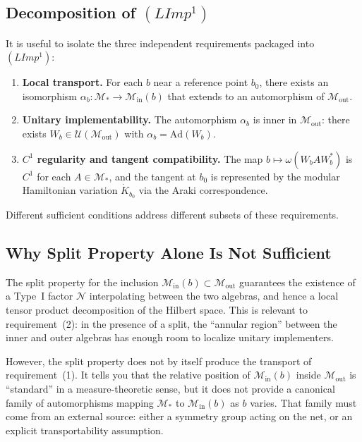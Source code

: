 \documentclass[12pt]{article}
\theoremstyle{definition}
\theoremstyle{remark}
\begin{document}
\subsection{Decomposition of \texorpdfstring{$(LImp^1)$}{(LImp1)}}\label{decomposition-limp}

It is useful to isolate the three independent requirements packaged into $(LImp^1)$:

\begin{enumerate}
\item \textbf{Local transport.} For each $b$ near a reference point $b_0$, there exists an isomorphism $\alpha_b\colon \mathcal{M}_* \to \mathcal{M}_{\mathrm{in}}(b)$ that extends to an automorphism of $\mathcal{M}_{\mathrm{out}}$.
\item \textbf{Unitary implementability.} The automorphism $\alpha_b$ is inner in $\mathcal{M}_{\mathrm{out}}$: there exists $W_b \in \mathcal{U}(\mathcal{M}_{\mathrm{out}})$ with $\alpha_b = \mathrm{Ad}(W_b)$.
\item \textbf{$C^1$ regularity and tangent compatibility.} The map $b \mapsto \omega(W_b A W_b^*)$ is $C^1$ for each $A \in \mathcal{M}_*$, and the tangent at $b_0$ is represented by the modular Hamiltonian variation $\dot{K}_{b_0}$ via the Araki correspondence.
\end{enumerate}

Different sufficient conditions address different subsets of these requirements.

\subsection{Why Split Property Alone Is Not Sufficient}\label{why-split-alone-insufficient}

The split property for the inclusion $\mathcal{M}_{\mathrm{in}}(b) \subset \mathcal{M}_{\mathrm{out}}$ guarantees the existence of a Type~I factor $\mathcal{N}$ interpolating between the two algebras, and hence a local tensor product decomposition of the Hilbert space. This is relevant to requirement~(2): in the presence of a split, the ``annular region'' between the inner and outer algebras has enough room to localize unitary implementers.

However, the split property does not by itself produce the transport of requirement~(1). It tells you that the relative position of $\mathcal{M}_{\mathrm{in}}(b)$ inside $\mathcal{M}_{\mathrm{out}}$ is ``standard'' in a measure-theoretic sense, but it does not provide a canonical family of automorphisms mapping $\mathcal{M}_*$ to $\mathcal{M}_{\mathrm{in}}(b)$ as $b$ varies. That family must come from an external source: either a symmetry group acting on the net, or an explicit transportability assumption.
\end{document}
